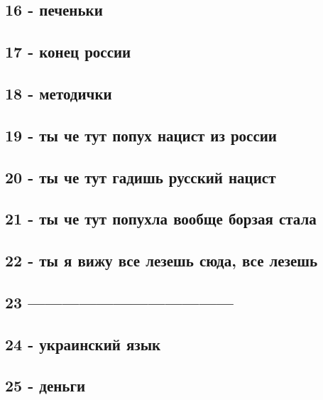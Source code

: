 \subsection{16 - печеньки}

\subsection{17 - конец россии}

\subsection{18 - методички}

\subsection{19 - ты че тут попух нацист из россии}

\subsection{20 - ты че тут гадишь русский нацист}

\subsection{21 - ты че тут попухла вообще борзая стала}

\subsection{22 - ты я вижу все лезешь сюда, все лезешь}

\subsection{23 ------------------------------------}

\subsection{24 - украинский язык}

\subsection{25 - деньги}


